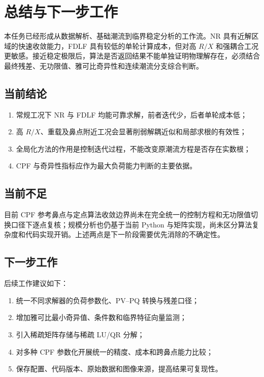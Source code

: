 \section{总结与下一步工作}
\label{sec:conclusion}

本任务已经形成从数据解析、基础潮流到临界稳定分析的工作流。NR 具有近解区域的快速收敛能力，FDLF 具有较低的单轮计算成本，但对高 $R/X$ 和强耦合工况更敏感。接近稳定极限后，算法是否返回结果不能单独证明物理解存在，必须结合最终残差、无功限值、雅可比奇异性和连续潮流分支综合判断。

\subsection{当前结论}

\begin{enumerate}
  \item 常规工况下 NR 与 FDLF 均能可靠求解，前者迭代少，后者单轮成本低；
  \item 高 $R/X$、重载及鼻点附近工况会显著削弱解耦近似和局部求根的有效性；
  \item 全局化方法的作用是控制迭代过程，不能改变原潮流方程是否存在实数根；
  \item CPF 与奇异性指标应作为最大负荷能力判断的主要依据。
\end{enumerate}

\subsection{当前不足}

目前 CPF 参考鼻点与定点算法收敛边界尚未在完全统一的控制方程和无功限值切换口径下逐点复核；规模分析也仍基于当前 Python 与矩阵实现，尚未区分算法复杂度和代码实现开销。上述两点是下一阶段需要优先消除的不确定性。

\subsection{下一步工作}

后续工作建议如下：
\begin{enumerate}
  \item 统一不同求解器的负荷参数化、PV--PQ 转换与残差口径；
  \item 增加雅可比最小奇异值、条件数和临界特征向量监测；
  \item 引入稀疏矩阵存储与稀疏 LU/QR 分解；
  \item 对多种 CPF 参数化开展统一的精度、成本和跨鼻点能力比较；
  \item 保存配置、代码版本、原始数据和图像来源，提高结果可复现性。
\end{enumerate}
